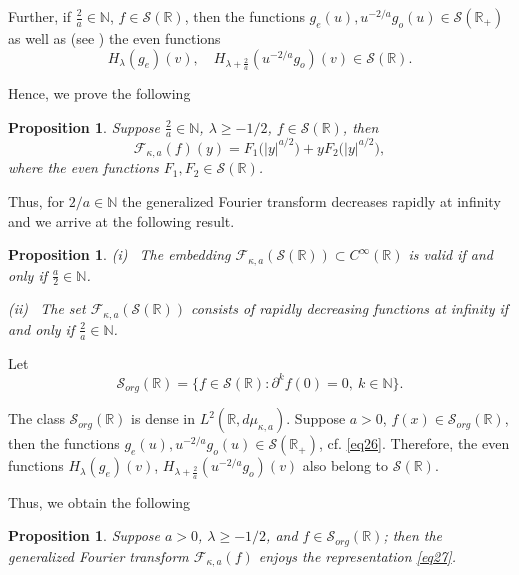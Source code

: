 \documentclass[12pt,twoside,reqno]{amsart}\usepackage[cp1251]{inputenc}
\theoremstyle{plain}
\newtheorem{proposition}[theorem]{Proposition}
\theoremstyle{remark}
\begin{document}
Further, if $\frac{2}{a}\in\mathbb{N}$, $f\in\mathcal{S}(\mathbb{R})$, then the functions  $g_e(u),u^{-2/a}g_o(u) \in\mathcal{S}(\mathbb{R}_+)$ as well as (see \cite{Ro02}) the even functions
\[
 H_{\lambda}(g_e)(v),\quad H_{\lambda+\frac{2}{a}}(u^{-2/a}g_o)(v)\in \mathcal{S}(\mathbb{R}).
\]

Hence, we prove the following

\begin{proposition}\label{lem9}
Suppose $\frac{2}{a}\in\mathbb{N}$, $\lambda\ge-1/2$, $f\in\mathcal{S}(\mathbb{R})$, then
\begin{equation}\label{eq27}
\mathcal{F}_{\kappa,a}(f)(y)=F_1\bigl(|y|^{a/2}\bigr)+yF_2\bigl(|y|^{a/2}\bigr),
\end{equation}
where the even functions  $F_1,F_2\in\mathcal{S}(\mathbb{R})$.
\end{proposition}


Thus, for $2/a\in\mathbb{N}$ the generalized Fourier transform decreases rapidly at infinity
and we arrive at the following result.

\begin{proposition}
\textup{(i)} \
The embedding $\mathcal{F}_{\kappa,a}(\mathcal{S}(\mathbb{R}))\subset C^{\infty}(\mathbb{R})$ is valid if and only if $\frac{a}{2}\in\mathbb{N}$.

\smallbreak
\textup{(ii)} \
The set $\mathcal{F}_{\kappa,a}(\mathcal{S}(\mathbb{R}))$ consists of rapidly decreasing functions at infinity  if and only if $\frac{2}{a}\in\mathbb{N}$.
\end{proposition}

Let
\[
\mathcal{S}_{org}(\mathbb{R})=\{f\in\mathcal{S}(\mathbb{R})\colon \partial^{k}f(0)=0,\ k\in\mathbb{N}\}.
\]

The class $\mathcal{S}_{org}(\mathbb{R})$ is dense in  $L^{2}(\mathbb{R},d\mu_{\kappa,a})$.
Suppose  $a>0$, $f(x)\in\mathcal{S}_{org}(\mathbb{R})$, then the functions $g_e(u),u^{-2/a}g_o(u) \in\mathcal{S}(\mathbb{R}_+)$, cf. \eqref{eq26}. Therefore, the even functions  $H_{\lambda}(g_e)(v)$, $H_{\lambda+\frac{2}{a}}(u^{-2/a}g_o)(v)$ also belong  to $\mathcal{S}(\mathbb{R})$.

Thus, we obtain the following

\begin{proposition}
Suppose $a>0$, $\lambda\ge-1/2$, and $f\in\mathcal{S}_{org}(\mathbb{R})$; then the generalized Fourier transform  $\mathcal{F}_{\kappa,a}(f)$ enjoys the representation  \eqref{eq27}.
\end{proposition}
\end{document}
